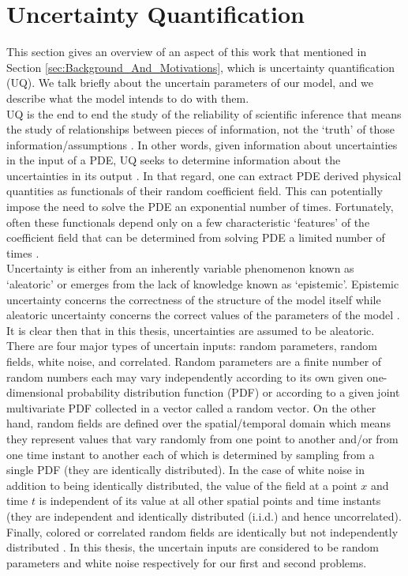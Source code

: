 \section{Uncertainty Quantification}
This section gives an overview of an aspect of this work that mentioned in Section \eqref{sec:Background_And_Motivations}, which is uncertainty quantification (UQ). We talk briefly about the uncertain parameters of our model, and we describe what the model intends to do with them.\\
UQ is the end to end the study of the reliability of scientific inference that means the study of relationships between pieces of information, not the `truth' of those information/assumptions \cite{UQIntro_Sullivan}. In other words, given information about uncertainties in the input of a PDE, UQ seeks to determine information about the uncertainties in its output \cite{UQIntroGunzburger}. In that regard, one can extract PDE derived physical quantities as functionals of their random coefficient field. This can potentially impose the need to solve the PDE an exponential number of times. Fortunately, often these functionals depend only on a few characteristic `features' of the coefficient field that can be determined from solving PDE a limited number of times \cite{Base_paper}.\\
Uncertainty is either from an inherently variable phenomenon known as `aleatoric' or emerges from the lack of knowledge known as `epistemic'. Epistemic uncertainty concerns the correctness of the structure of the model itself while aleatoric uncertainty concerns the correct values of the parameters of the model \cite{UQIntro_Sullivan}. It is clear then that in this thesis, uncertainties are assumed to be aleatoric.\\
There are four major types of uncertain inputs: random parameters, random fields, white noise, and correlated. Random parameters are a finite number of random numbers each may vary independently according to its own given one-dimensional probability distribution function (PDF) or according to a given joint multivariate PDF collected in a vector called a random vector. On the other hand, random fields are defined over the spatial/temporal domain which means they represent values that vary randomly from one point to another and/or from one time instant to another each of which is determined by sampling from a single PDF (they are identically distributed). In the case of white noise in addition to being identically distributed, the value of the field at a point $x$ and time $t$ is independent of its value at all other spatial points and time instants (they are independent and identically distributed (i.i.d.) and hence uncorrelated). Finally, colored or correlated random fields are identically but not independently distributed  \cite{UQIntroGunzburger}. In this thesis, the uncertain inputs are considered to be random parameters and white noise respectively for our first and second problems.\\
